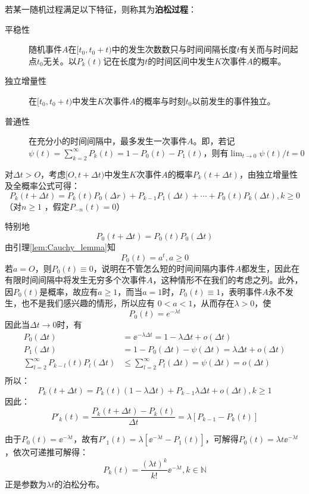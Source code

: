 \begin{definition}[泊松过程]
    若某一随机过程满足以下特征，则称其为\textbf{泊松过程}：
    \begin{description}
        \item[平稳性] 随机事件$A$在$[t_0, t_0 + t)$中的发生次数数只与时间间隔长度$t$有关而与时间起点$t_0$无关。以$P_k(t)$记在长度为$t$的时间区间中发生$K$次事件$A$的概率。
        \item[独立增量性] 在$[t_0, t_0 + t)$中发生$K$次事件$A$的概率与时刻$t_0$以前发生的事件独立。
        \item[普通性] 在充分小的时间间隔中，最多发生一次事件$A$。即，若记$\psi(t)=\sum_{k=2}^{\infty}P_k(t)=1-P_0(t)-P_1(t)$，则有$\lim_{t \to 0}\psi(t)/t=0$
    \end{description}
\end{definition}

对$\Delta t>O$，考虑$[O,t+\Delta t)$中发生$K$次事件$A$的概率$P_k(t+\Delta t)$，由独立增量性及全概率公式可得：
\[ P_k(t+\Delta t)=P_k(t)P_0(\Delta r) + P_{k-1}P_1(\Delta t)+ \cdots +P_0(t)P_k(\Delta t) ,k\ge 0\]
（对$n\ge 1$ ，假定$P_{-n}(t)=0$）

特别地
\[ P_0(t+\Delta t)=P_0(t)P_0(\Delta t) \]
由引理\ref{lem:Cauchy_lemma}知
\[ P_0(t)=a^{t}, a\ge 0 \]
若$a=O$，则$P_0(t) \equiv 0$，说明在不管怎么短的时间间隔内事件$A$都发生，因此在有限时间间隔中将发生无穷多个次事件$A$，这种情形不在我们的考虑之列。此外，因$P_0(t)$是概率，故应有$a\ge 1$，而当$a=1$时，$P_0(t) \equiv 1$，表明事件$A$永不发生，也不是我们感兴趣的情形，所以应有 $0<a<1$，从而存在$\lambda>0$，使
\[ P_0(t)=e^{-\lambda t} \]
因此当$\Delta t \to 0$时，有
\begin{align*}
    P_{0}(\Delta t)                                & =\ee^{-\lambda \Delta t}=1-\lambda \Delta t+o(\Delta t)                  \\
    P_{1}(\Delta t)                                & =1-P_{0}(\Delta t)-\psi(\Delta t)=\lambda \Delta t+o(\Delta t)           \\
    \sum_{l=2}^{\infty} P_{k-l}(t) P_{l}(\Delta t) & \leqslant \sum_{l=2}^{\infty} P_{l}(\Delta t)=\psi(\Delta t)=o(\Delta t) \\
\end{align*}
所以：
\[ P_k(t+\Delta t)=P_k(t)(1-\lambda \Delta t) + P_{k-1}\lambda \Delta t+ o(\Delta t) ,k\ge 1\]
因此：
\[ P'_k(t)= \frac{P_k(t+\Delta t)-P_k(t)}{\Delta t} = \lambda[P_{k-1}-P_k(t)] \]

由于$P_0(t)=\ee^{-\lambda t}$，故有$P'_1(t)=\lambda[\ee^{-\lambda t}-P_1(t)]$，可解得$P_0(t)=\lambda t \ee^{-\lambda t}$，依次可递推可解得：
\[ P_k(t)=\frac{(\lambda t)^k}{k!}\ee^{-\lambda t}, k \in \mathbb{N}\]
正是参数为$\lambda t$的泊松分布。

